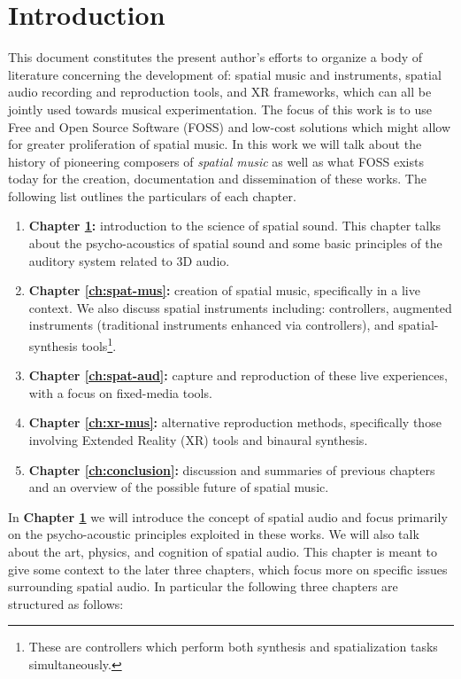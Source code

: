 \chapter{Introduction} \label{ch:intro}

This document constitutes the present author's efforts to organize a body of literature concerning the development of: spatial music and instruments, spatial audio recording and reproduction tools, and XR frameworks, which can all be jointly used towards musical experimentation. The focus of this work is to use Free and Open Source Software (FOSS) and low-cost solutions which might allow for greater proliferation of spatial music. In this work we will talk about the history of pioneering composers of \textit{spatial music} as well as what FOSS exists today for the creation, documentation and dissemination of these works. The following list outlines the particulars of each chapter.

\begin{enumerate}

    \item \textbf{Chapter \ref{ch:intro}:} introduction to the science of spatial sound. This chapter talks about the psycho-acoustics of spatial sound and some basic principles of the auditory system related to 3D audio.
    \item \textbf{Chapter \ref{ch:spat-mus}:} creation of spatial music, specifically in a live context. We also discuss spatial instruments including: controllers, augmented instruments (traditional instruments enhanced via controllers), and spatial-synthesis tools\footnote{These are controllers which perform both synthesis and spatialization tasks simultaneously.}.
    \item \textbf{Chapter \ref{ch:spat-aud}:} capture and reproduction of these live experiences, with a focus on fixed-media tools. 
    \item \textbf{Chapter \ref{ch:xr-mus}:} alternative reproduction methods, specifically those involving Extended Reality (XR) tools and binaural synthesis.
    \item \textbf{Chapter \ref{ch:conclusion}:} discussion and summaries of previous chapters and an overview of the possible future of spatial music.
    
\end{enumerate}

In \textbf{Chapter \ref{ch:intro}} we will introduce the concept of spatial audio and focus primarily on the psycho-acoustic principles exploited in these works. We will also talk about the art, physics, and cognition of spatial audio. This chapter is meant to give some context to the later three chapters, which focus more on specific issues surrounding spatial audio. In particular the following three chapters are structured as follows:

